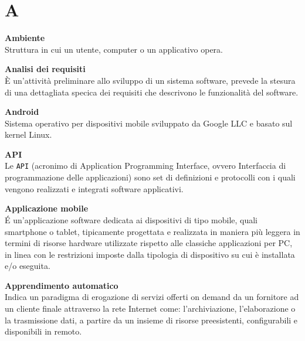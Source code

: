 \documentclass[a4paper, oneside, openany, dvipsnames, table, 12pt]{article}
\begin{document}
\copertina{}

\newpage
\tableofcontents
\newpage

\newpage
\section{A}  
\textbf{Ambiente} \\
Struttura in cui un utente, computer o un applicativo opera.

\textbf{Analisi dei requisiti} \\
È un'attività preliminare allo sviluppo di un sistema software, prevede la stesura di
una dettagliata specica dei requisiti che descrivono le funzionalità del software.

\textbf{Android} \\
Sistema operativo per dispositivi mobile sviluppato da Google LLC e basato sul kernel Linux.

\textbf{API} \\
Le \texttt{API} (acronimo di Application Programming Interface, ovvero Interfaccia di programmazione delle applicazioni) sono set di definizioni e protocolli con i quali vengono realizzati e integrati software applicativi. 

\textbf{Applicazione mobile} \\
\'E un'applicazione software dedicata ai dispositivi di tipo mobile, quali smartphone o tablet, tipicamente progettata e realizzata in maniera più leggera in termini di risorse hardware utilizzate rispetto alle classiche applicazioni per PC, in linea con le restrizioni imposte dalla tipologia di dispositivo su cui è installata e/o eseguita. 

\label{par:appr_auto}
\textbf{Apprendimento automatico} \\ 
Indica un paradigma di erogazione di servizi offerti on demand da un fornitore ad un cliente finale attraverso la rete Internet come: l'archiviazione, l'elaborazione o la trasmissione dati, a partire da un insieme di risorse preesistenti, configurabili e disponibili in remoto.
\end{document}
